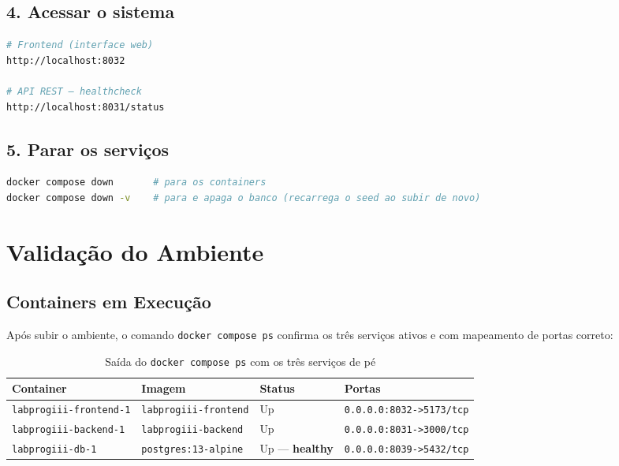\documentclass[12pt, a4paper]{article}
\newcommand{\thead}[1]{\cellcolor{tableheader}\color{white}\bfseries #1}
\newcommand{\talt}{\rowcolor{tablerowalt}}
\begin{document}
\subsection{4. Acessar o sistema}

\begin{lstlisting}[language=Bash]
# Frontend (interface web)
http://localhost:8032

# API REST — healthcheck
http://localhost:8031/status
\end{lstlisting}

\subsection{5. Parar os serviços}

\begin{lstlisting}[language=Bash]
docker compose down       # para os containers
docker compose down -v    # para e apaga o banco (recarrega o seed ao subir de novo)
\end{lstlisting}

\section{Validação do Ambiente}

\subsection{Containers em Execução}

Após subir o ambiente, o comando \texttt{docker compose ps} confirma os três serviços ativos e com
mapeamento de portas correto:

\begin{table}[H]
\centering
\begin{tabularx}{\textwidth}{|l|l|l|X|}
\hline
\thead{Container} & \thead{Imagem} & \thead{Status} & \thead{Portas} \\
\hline
\texttt{labprogiii-frontend-1} & \texttt{labprogiii-frontend} & Up & \texttt{0.0.0.0:8032->5173/tcp} \\
\talt \texttt{labprogiii-backend-1}  & \texttt{labprogiii-backend}  & Up & \texttt{0.0.0.0:8031->3000/tcp} \\
\texttt{labprogiii-db-1}       & \texttt{postgres:13-alpine} & Up — \textbf{healthy} & \texttt{0.0.0.0:8039->5432/tcp} \\
\hline
\end{tabularx}
\caption{Saída do \texttt{docker compose ps} com os três serviços de pé}
\end{table}
\end{document}
